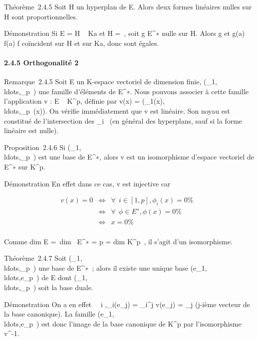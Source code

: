 \documentclass[]{article}
\begin{document}
Théorème~2.4.5 Soit H un hyperplan de E. Alors deux formes linéaires
nulles sur H sont proportionnelles.

Démonstration Si E = H \oplus~ Ka et H =\
\mathrmKerf, soit g \in E^∗ nulle sur H.
Alors g et  g(a) \over f(a) f coïncident sur H et sur
Ka, donc sont égales.

\paragraph{2.4.5 Orthogonalité 2}

Remarque~2.4.5 Soit E un K-espace vectoriel de dimension finie,
(\phi_1,\\ldots,\phi_p~)
une famille d'éléments de E^∗. Nous pouvons associer à cette
famille l'application v : E \rightarrow~ K^p, définie par v(x) =
(\phi_1(x),\\ldots,\phi_p~(x)).
On vérifie immédiatement que v est linéaire. Son noyau est constitué de
l'intersection des
\mathrmKer\phi_i~ (en
général des hyperplans, sauf si la forme linéaire est nulle).

Proposition~2.4.6 Si
(\phi_1,\\ldots,\phi_p~)
est une base de E^∗, alors v est un isomorphisme d'espace
vectoriel de E^∗ sur K^p.

Démonstration En effet dans ce cas, v est injective car

\begin{align*} v(x) = 0&
\Leftrightarrow & \forall~~i \in
[1,p], \phi_i(x) = 0\%& \\ &
\Leftrightarrow & \forall~~\phi \in
E^∗, \phi(x) = 0 \%& \\ &
\Leftrightarrow & x = 0 \%&
\\ \end{align*}

Comme dim E =\ dim~
E^∗ = p = dim K^p~, il
s'agit d'un isomorphisme.

Théorème~2.4.7 Soit
(\phi_1,\\ldots,\phi_p~)
une base de E^∗~; alors il existe une unique base
(e_1,\\ldots,e_p~)
de E dont
(\phi_1,\\ldots,\phi_p~)
soit la base duale.

Démonstration On a en effet \forall~~i \in
[1,p],\phi_i(e_j) = \delta_i^j
\Leftrightarrow v(e_j) = \epsilon_j (j-ième
vecteur de la base canonique). La famille
(e_1,\\ldots,e_p~)
est donc l'image de la base canonique de K^p par
l'isomorphisme v^-1.
\end{document}
